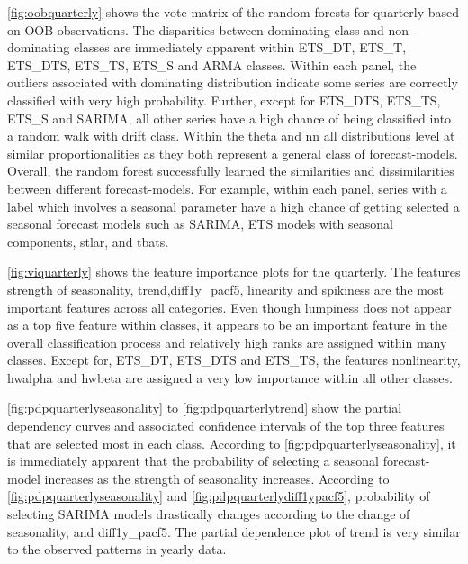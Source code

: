 \documentclass[11pt,a4paper,]{article}
\begin{document}
\autoref{fig:oobquarterly} shows the vote-matrix of the random forests for quarterly based on OOB observations. The disparities between dominating class and non-dominating classes are immediately apparent within ETS\_DT, ETS\_T, ETS\_DTS, ETS\_TS, ETS\_S and ARMA classes. Within each panel, the outliers associated with dominating distribution indicate some series are correctly classified with very high probability. Further, except for ETS\_DTS, ETS\_TS, ETS\_S and SARIMA, all other series have a high chance of being classified into a random walk with drift class. Within the theta and nn all distributions level at similar proportionalities as they both represent a general class of forecast-models. Overall, the random forest successfully learned the similarities and dissimilarities between different forecast-models. For example, within each panel, series with a label which involves a seasonal parameter have a high chance of getting selected a seasonal forecast models such as SARIMA, ETS models with seasonal components, stlar, and tbats.

\autoref{fig:viquarterly} shows the feature importance plots for the quarterly. The features strength of seasonality, trend,diff1y\_pacf5, linearity and spikiness are the most important features across all categories. Even though lumpiness does not appear as a top five feature within classes, it appears to be an important feature in the overall classification process and relatively high ranks are assigned within many classes. Except for, ETS\_DT, ETS\_DTS and ETS\_TS, the features nonlinearity, hwalpha and hwbeta are assigned a very low importance within all other classes.

\autoref{fig:pdpquarterlyseasonality} to \autoref{fig:pdpquarterlytrend} show the partial dependency curves and associated confidence intervals of the top three features that are selected most in each class. According to \autoref{fig:pdpquarterlyseasonality}, it is immediately apparent that the probability of selecting a seasonal forecast-model increases as the strength of seasonality increases. According to \autoref{fig:pdpquarterlyseasonality} and \autoref{fig:pdpquarterlydiff1ypacf5}, probability of selecting SARIMA models drastically changes according to the change of seasonality, and diff1y\_pacf5. The partial dependence plot of trend is very similar to the observed patterns in yearly data.
\end{document}

